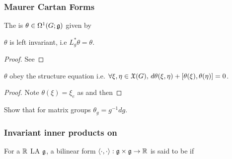 \documentclass{article}
\begin{document}
\subsubsection{Maurer Cartan Forms}

\begin{definition}
	The  is $\theta \in \Omega^1(G;\mf{g})$ given by 
\end{definition}

\begin{lemma}
	$\theta$ is left invariant, i.e $L_g^\ast \theta = \theta$.
\end{lemma}
\begin{proof}
	See
\end{proof}

\begin{prop}
	$\theta$ obey the structure equation 
i.e. $\forall \xi, \eta \in \mf{X}(G), \, d\theta(\xi,\eta) + \comm[\theta(\xi)]{\theta(\eta)} = 0$.
\end{prop}
\begin{proof}
	Note $\theta(\xi) = \xi_e$ as 
and then 

\end{proof}

\begin{ex}
	Show that for matrix groups $\theta_g = g^{-1}dg$.
\end{ex}

\subsubsection{Invariant inner products on }
	
\begin{definition}
	For a $\mbb{R}$ LA $\mf{g}$, a bilinear form $\pangle{\cdot,\cdot}:\mf{g} \times \mf{g} \to \mbb{R}$ is said to be  if 
\end{definition}
\end{document}
